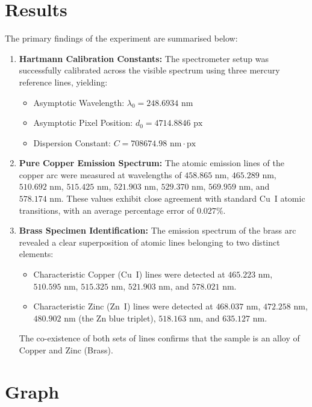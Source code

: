 \documentclass[12pt, a4paper]{article}
\begin{document}
\section{Results}
The primary findings of the experiment are summarised below:
\begin{enumerate}
    \item \textbf{Hartmann Calibration Constants:}
    The spectrometer setup was successfully calibrated across the visible spectrum using three mercury reference lines, yielding:
    \begin{itemize}
        \item Asymptotic Wavelength: $\lambda_0 = 248.6934\text{ nm}$
        \item Asymptotic Pixel Position: $d_0 = 4714.8846\text{ px}$
        \item Dispersion Constant: $C = 708674.98\text{ nm}\cdot\text{px}$
    \end{itemize}

    \item \textbf{Pure Copper Emission Spectrum:}
    The atomic emission lines of the copper arc were measured at wavelengths of $458.865\text{ nm}$, $465.289\text{ nm}$, $510.692\text{ nm}$, $515.425\text{ nm}$, $521.903\text{ nm}$, $529.370\text{ nm}$, $569.959\text{ nm}$, and $578.174\text{ nm}$. These values exhibit close agreement with standard Cu~I atomic transitions, with an average percentage error of $0.027\%$.

    \item \textbf{Brass Specimen Identification:}
    The emission spectrum of the brass arc revealed a clear superposition of atomic lines belonging to two distinct elements:
    \begin{itemize}
        \item Characteristic Copper (Cu~I) lines were detected at $465.223\text{ nm}$, $510.595\text{ nm}$, $515.325\text{ nm}$, $521.903\text{ nm}$, and $578.021\text{ nm}$.
        \item Characteristic Zinc (Zn~I) lines were detected at $468.037\text{ nm}$, $472.258\text{ nm}$, $480.902\text{ nm}$ (the Zn blue triplet), $518.163\text{ nm}$, and $635.127\text{ nm}$.
    \end{itemize}
    The co-existence of both sets of lines confirms that the sample is an alloy of Copper and Zinc (Brass).
\end{enumerate}

\section{Graph}
\end{document}
